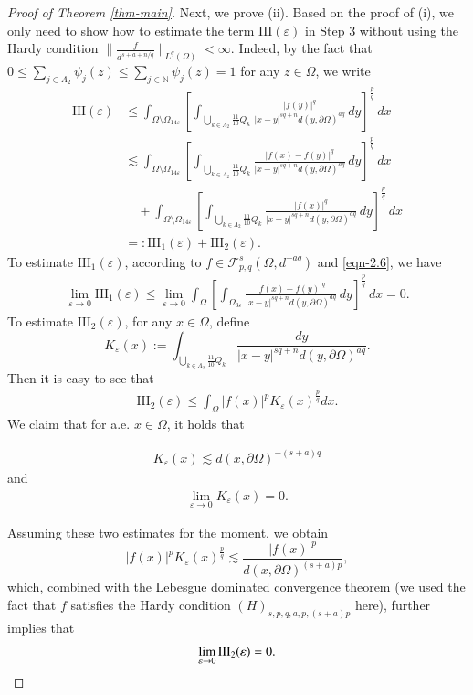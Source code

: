 \documentclass[11pt,twoside]{article}
\def\nn{{\mathbb N}}
\def\cf{{\mathcal F}}
\def\Qk{\frac{11}{10}Q_k}
\def\boz{{\Omega}}
\def\vez{\varepsilon}
\def\pa{\partial}                %
\def\huafwe{{\cf}_{p,q}^s(\boz,d^{-aq})}
\theoremstyle{mylem}
\theoremstyle{definition}
\numberwithin{equation}{section}
\begin{document}
\begin{proof}[Proof of Theorem \ref{thm-main}]
Next, we prove (ii). Based on the proof of (i), we only need to show 
how to estimate the term $\mathrm{III}(\vez)$ in Step 3
without using the Hardy condition $\|\frac{f}{d^{s+a+n/q}}\|_{L^q(\Omega)}<\infty$.
Indeed, by the fact that $0\leq\sum_{j\in\Lambda_2}\psi_j(z)\leq\sum_{j\in\nn}\psi_j(z)=1$ 
for any $z\in\boz$, we write
\begin{align*}
\mathrm{III}(\vez)
&\leq \int_{\Omega \setminus \Omega_{14\varepsilon}} \left[ \int_{\bigcup_{k \in \Lambda_2} \Qk} \frac{| f(y)|^q}{|x - y|^{s q + n}d(y,\pa\boz)^{aq}}\,dy \right]^{\frac{p}{q}}\,dx \nonumber\\
&\lesssim \int_{\Omega \setminus \Omega_{14\varepsilon}} \left[ \int_{\bigcup_{k \in \Lambda_2} \Qk} \frac{| f(x) - f(y)|^q}{|x - y|^{s q + n}d(y,\pa\boz)^{aq}}\,dy \right]^{\frac{p}{q}}\,dx \nonumber\\
&\quad+ \int_{\Omega \setminus \Omega_{14\varepsilon}} \left[ \int_{\bigcup_{k \in \Lambda_2} \Qk} \frac{|f(x) |^q}{|x - y|^{s q + n}d(y,\pa\boz)^{aq}}\,dy \right]^{\frac{p}{q}}\,dx \nonumber\\
&=:\mathrm{III}_1(\vez) + \mathrm{III}_2(\vez).
\end{align*}
To estimate $\mathrm{III}_1(\vez)$, according to \( f \in \huafwe \) and \eqref{eqn-2.6}, we have
\begin{align*}
\lim_{\varepsilon \to 0}\mathrm{III}_1(\vez) \leq \lim_{\varepsilon \to 0}\int_\Omega \left[ \int_{\Omega_{3\varepsilon}} \frac{|f(x) -  f(y)|^q}{|x - y|^{s q + n}d(y,\pa\boz)^{aq}}\,dy \right]^{\frac{p}{q}} \,dx = 0. 
\end{align*}
To estimate \( \mathrm{III}_2(\vez) \), for any \( x \in \Omega \), define
$$
K_\varepsilon(x)
:=
\int_{\bigcup_{k\in\Lambda_2}\frac{11}{10}Q_k}
\frac{dy}
{|x-y|^{sq+n}d(y,\partial\Omega)^{aq}}.
$$
Then it is easy to see that
\begin{align*}
\mathrm{III}_2(\varepsilon)
\le
\int_{\Omega}
|f(x)|^p K_\varepsilon(x)^\frac{p}{q}dx.
\end{align*}
We claim that for a.e. $x\in \Omega$, it holds that

\begin{align}\label{eqn=3.x22}
K_\varepsilon(x)
\lesssim
d(x,\partial\Omega)^{-(s+a)q}
\end{align}
and 
\begin{align}\label{eqn=3.x22x}
\lim_{\vez\to0}K_\varepsilon(x)= 0 .
\end{align}

Assuming these two estimates for the moment, we obtain
\[
|f(x)|^pK_\varepsilon(x)^\frac{p}{q}
\lesssim
\frac{|f(x)|^p}{d(x,\partial\Omega)^{(s+a)p}},
\]
which, combined with the Lebesgue dominated convergence theorem (we used the fact that $f$ satisfies the Hardy condition $(H)_{s,p,q,a,p,(s+a)p}$ here), further implies that 
\[
\lim_{\varepsilon\to0}{\rm III}_2(\varepsilon)=0.
\]


\end{proof}
\end{document}
